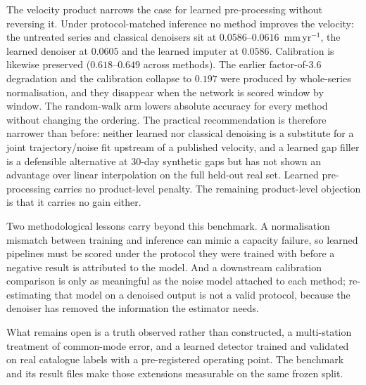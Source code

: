 The velocity product narrows the case for learned pre-processing without
reversing it. Under protocol-matched inference no method improves the velocity:
the untreated series and classical denoisers sit at
$0.0586$--$0.0616$~mm\,yr$^{-1}$, the learned denoiser at $0.0605$ and the
learned imputer at $0.0586$. Calibration is likewise preserved
($0.618$--$0.649$ across methods). The earlier factor-of-$3.6$ degradation and
the calibration collapse to $0.197$ were produced by whole-series
normalisation, and they disappear when the network is scored window by window.
The random-walk arm lowers absolute accuracy for every method without changing
the ordering. The practical recommendation is therefore narrower than before:
neither learned nor classical denoising is a substitute for a joint
trajectory/noise fit upstream of a published velocity, and a learned gap filler
is a defensible alternative at 30-day synthetic gaps but has not shown an
advantage over linear interpolation on the full held-out real set. Learned
pre-processing carries no product-level penalty. The remaining product-level objection is that
it carries no gain either.

Two methodological lessons carry beyond this benchmark. A normalisation
mismatch between training and inference can mimic a capacity failure, so learned
pipelines must be scored under the protocol they were trained with before a
negative result is attributed to the model. And a downstream calibration
comparison is only as meaningful as the noise model attached to each method;
re-estimating that model on a denoised output is not a valid protocol, because
the denoiser has removed the information the estimator needs.

What remains open is a truth observed rather than constructed, a multi-station
treatment of common-mode error, and a learned detector trained and validated on
real catalogue labels with a pre-registered operating point. The benchmark and
its result files make those extensions measurable on the same frozen split.
